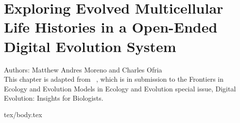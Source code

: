 \chapter{Exploring Evolved Multicellular Life Histories in a Open-Ended Digital Evolution System}
\label{ch:case-studies}

\noindent
Authors: Matthew Andres Moreno and Charles Ofria \\
This chapter is adapted from ~\citep{moreno2021exploring}, which is in submission to the Frontiers in Ecology and Evolution
Models in Ecology and Evolution special issue, Digital Evolution: Insights for Biologists.

{tex/body.tex}

